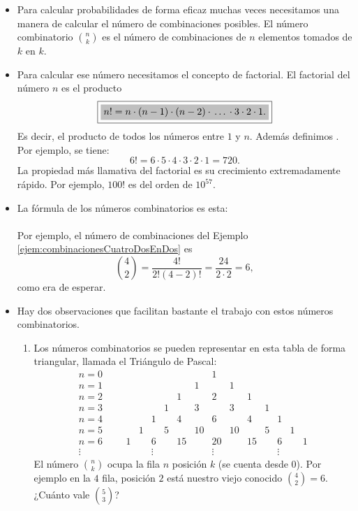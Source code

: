 \begin{itemize}

    \item Para calcular probabilidades de forma eficaz muchas veces necesitamos una manera de calcular el número de combinaciones posibles. El {\sf número combinatorio} $\binom{n}{k}$ es el número de combinaciones de $n$ elementos tomados de $k$ en $k$.

    \item Para calcular ese número necesitamos el concepto de {\sf factorial}. El factorial del número $n$ es el producto
        \[\fbox{\colorbox{Gris025}{$n!=n\cdot(n-1)\cdot(n-2)\cdot\,\ldots\,\cdot3\cdot 2\cdot 1.$}}\]
        Es decir, el producto de todos los números entre $1$ y $n$. Además definimos . Por ejemplo, se tiene:
        \[6!=6\cdot 5\cdot 4\cdot 3\cdot 2\cdot 1=720.\]
        La propiedad más llamativa del factorial es su crecimiento extremadamente rápido. Por ejemplo, $100!$ es del orden de $10^{57}$.

    \item La fórmula de los números combinatorios es esta:
    \\[3mm]
        \\[3mm]
        Por ejemplo, el número de combinaciones del Ejemplo \ref{ejem:combinacionesCuatroDosEnDos} es
        \[\binom{4}{2}=\dfrac{4!}{2!(4-2)!}=\dfrac{24}{2\cdot 2}=6,\]
        como era de esperar.

    \item Hay dos observaciones que facilitan bastante el trabajo con estos números combinatorios.
    \begin{enumerate}
        \item Los números combinatorios se pueden representar en esta tabla de forma triangular, llamada el {\sf Triángulo de Pascal}:
        \[
        \begin{array}{l|llcccccccccccccc}
        n=0&&&&&&&&&1\\
        n=1&&&&&&&&1&&1\\
        n=2&&&&&&&1&&2&&1\\
        n=3&&&&&&1&&3&&3&&1\\
        n=4&&&&&1&&4&&6&&4&&1\\
        n=5&&&&1&&5&&10&&10&&5&&1\\
        n=6&&&1&&6&&15&&20&&15&&6&&1\\
        \vdots&&& &&\vdots&& &&\vdots&& &&\vdots&&
        \end{array}
        \]
        El número $\binom{n}{k}$ ocupa la fila $n$ posición $k$ (se cuenta desde $0$). Por ejemplo en la $4$ fila, posición $2$ está nuestro viejo conocido $\binom{4}{2}=6$. ¿Cuánto vale $\binom{5}{3}$?


\end{enumerate}
\end{itemize}
